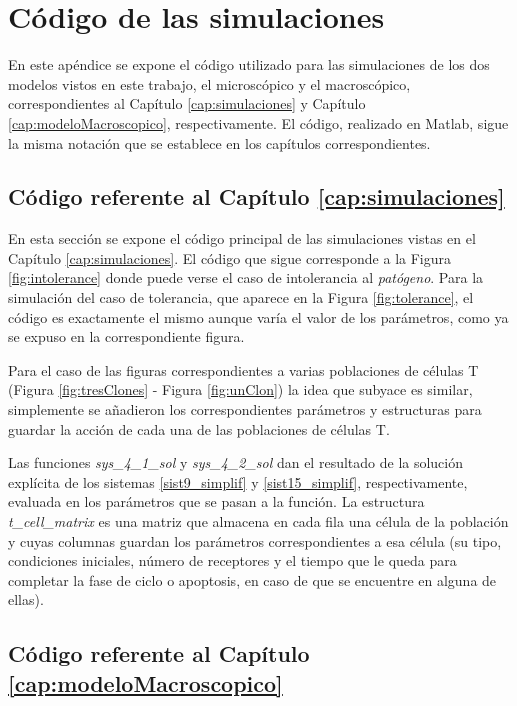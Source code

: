 \chapter{Código de las simulaciones}
\label{Appendix:A}

En este apéndice se expone el código utilizado para las simulaciones de los dos modelos vistos en este trabajo, el microscópico y el macroscópico, correspondientes al Capítulo \ref{cap:simulaciones} y Capítulo \ref{cap:modeloMacroscopico}, respectivamente. El código, realizado en Matlab, sigue la misma notación que se establece en los capítulos correspondientes.

\section{Código referente al Capítulo \ref{cap:simulaciones}}
\label{sec:codigoMicro}
En esta sección se expone el código principal de las simulaciones vistas en el Capítulo \ref{cap:simulaciones}. El código que sigue corresponde a la Figura \ref{fig:intolerance} donde puede verse el caso de intolerancia al \textit{patógeno}. Para la simulación del caso de tolerancia, que aparece en la Figura \ref{fig:tolerance}, el código es exactamente el mismo aunque varía el valor de los parámetros, como ya se expuso en la correspondiente figura. 

Para el caso de las figuras correspondientes a varias poblaciones de células T (Figura \ref{fig:tresClones} - Figura \ref{fig:unClon}) la idea que subyace es similar, simplemente se añadieron los correspondientes parámetros y estructuras para guardar la acción de cada una de las poblaciones de células T. 

Las funciones \textit{sys\_4\_1\_sol} y \textit{sys\_4\_2\_sol} dan el resultado de la solución explícita de los sistemas \ref{sist9_simplif} y \ref{sist15_simplif}, respectivamente, evaluada en los parámetros que se pasan a la función. La estructura \textit{t\_cell\_matrix} es una matriz que almacena en cada fila una célula de la población y cuyas columnas guardan los parámetros correspondientes a esa célula (su tipo, condiciones iniciales, número de receptores y el tiempo que le queda para completar la fase de ciclo o apoptosis, en caso de que se encuentre en alguna de ellas). 

\lstset{inputencoding=utf8/latin1}



\section{Código referente al Capítulo \ref{cap:modeloMacroscopico}}
\label{sec:codigoMacro}

